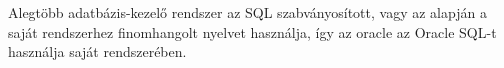 

\setlength{\parindent}{12.5mm}Alegtöbb adatbázis-kezelő rendszer az SQL szabványosított, vagy az alapján a saját rendszerhez finomhangolt nyelvet használja, így az oracle az Oracle SQL-t használja saját rendszerében. 


















\begin{comment}

\Section{OpenCV bemutatása}

Az OpenCV (Open Source Computer Vision Library) egy nyílt forráskódú számítógépes látás és gépi tanulási szoftverkönyvtár \cite{opencv}. Az OpenCV-t azért hozták létre, hogy közös infrastruktúrát biztosítson a számítógépes megjelenítési alkalmazások számára, és felgyorsítsa a gépi érzékelés használatát a kereskedelmi termékekben. BSD licenc alatt került kiadásra, ezért ingyenes mind tudományos, mind kereskedelmi célokra. C++, Python és Java interfészekkel rendelkezik, és támogatja a Windows, Linux, Mac OS, iOS és Android rendszereket. Az OpenCV-et a számítási hatékonyságra tervezték, és nagy hangsúlyt fektetett a valós idejű alkalmazásokra. Az optimalizált C/C++-ban írt, a könyvtár kihasználhatja a többmagos feldolgozást is. Az OpenCL használatával kihasználhatja az alapul szolgáló heterogén számítási platform hardveres gyorsítását.

A könyvtár több mint 2500 optimalizált algoritmussal rendelkezik, amely magába foglalja mind a klasszikus, mind a legmodernebb számítógépes látásmódot és a gépi tanulási algoritmusokat. Ezek az algoritmusok felismerhetik az arcokat, felismerhetik az objektumokat, osztályozhatják az emberi cselekvéseket a videókban, nyomon követhetik a mozgásokat, követhetik a mozgó objektumokat, eltávolíthatja a vörös szemeket a vakuval készített képekből, követheti a szemmozgásokat, felismerheti a tájat stb. 


\Section{Beépített művészi jellegű OpenCV-s szűrők}

Az OpenCV könyvtár rendelkezik saját bepített, nem fotorealisztikus szűrőkkel, amelyeknél csak a bemeneti képet, valamint néhány paramétert kell megadnunk a függvénynek és ő elkészíti nekünk a filterezett képet. Négy ilyen beépített függvény található az OpenCV-ben, Edge Preserving filter, Detail Enhancing filter, Pencil sketch filter és a Stylization filter. Ezek C++ implementációját szeretném bemutatni.


\end{comment}
